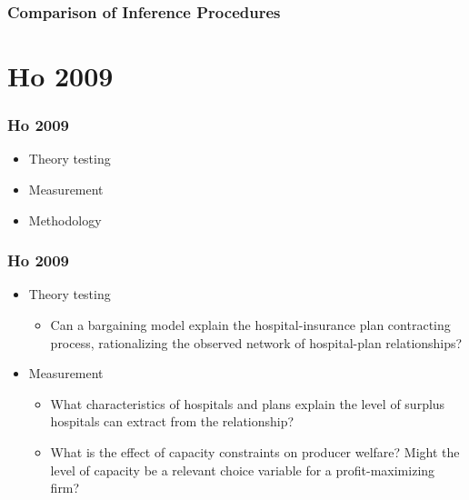 \documentclass[notes=show]{beamer}
\begin{document}

\begin{frame}
\frametitle{Comparison of Inference Procedures}

\begin{figure}[h!]
\begin{center}
\end{center}
\end{figure}
\end{frame}


\section{Ho 2009}

\begin{frame}
\frametitle{Ho 2009}

\begin{itemize}
	\item Theory testing
	\item Measurement
	\item Methodology
\end{itemize}
\end{frame}


\begin{frame}
\frametitle{Ho 2009}

\begin{itemize}
	\item Theory testing
         \begin{itemize}
	\item Can a bargaining model explain the hospital-insurance plan contracting process, rationalizing the observed network of hospital-plan relationships? 	\end{itemize}
	\item Measurement
	\begin{itemize}
	\item What characteristics of hospitals and plans explain the level of surplus hospitals can extract from the relationship?
	\item What is the effect of capacity constraints on producer welfare?  Might the level of capacity be a relevant choice variable for a profit-maximizing firm?
	\end{itemize}
\end{itemize}
\end{frame}
\end{document}
